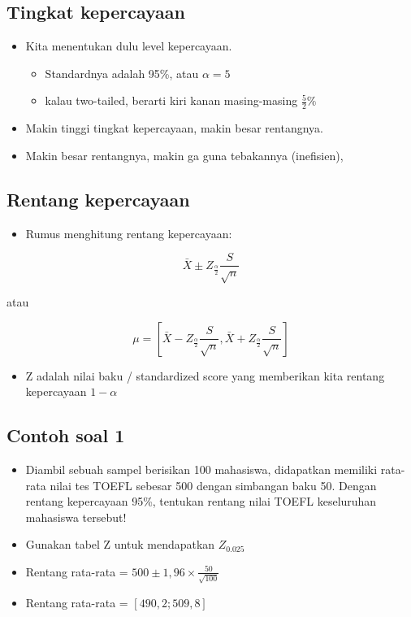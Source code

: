 \documentclass[
  letterpaper,
  DIV=11,
  numbers=noendperiod]{scrartcl}
\providecommand{\tightlist}{%
  \setlength{\itemsep}{0pt}\setlength{\parskip}{0pt}}\usepackage{longtable,booktabs,array}
\begin{document}
\hypertarget{tingkat-kepercayaan}{%
\subsection{Tingkat kepercayaan}\label{tingkat-kepercayaan}}

\begin{itemize}
\item
  Kita menentukan dulu level kepercayaan.

  \begin{itemize}
  \item
    Standardnya adalah 95\%, atau \(\alpha=5%
    \)
  \item
    kalau two-tailed, berarti kiri kanan masing-masing \(\frac{5}{2}\%\)
  \end{itemize}
\item
  Makin tinggi tingkat kepercayaan, makin besar rentangnya.
\item
  Makin besar rentangnya, makin ga guna tebakannya (inefisien),
\end{itemize}

\hypertarget{rentang-kepercayaan-1}{%
\subsection{Rentang kepercayaan}\label{rentang-kepercayaan-1}}

\begin{itemize}
\tightlist
\item
  Rumus menghitung rentang kepercayaan:
\end{itemize}

\[
\bar{X} \pm Z_{\frac{\alpha}{2}} \frac{S}{\sqrt{n}}
\]

atau

\[
\mu=\left[ \bar{X}-Z_{\frac{\alpha}{2}} \frac{S}{\sqrt{n}}, \bar{X}+Z_{\frac{\alpha}{2}}\frac{S}{\sqrt{n}}\right]
\]

\begin{itemize}
\tightlist
\item
  Z adalah nilai baku / standardized score yang memberikan kita rentang
  kepercayaan \(1-\alpha\)
\end{itemize}

\hypertarget{contoh-soal-1-1}{%
\subsection{Contoh soal 1}\label{contoh-soal-1-1}}

\begin{itemize}
\item
  Diambil sebuah sampel berisikan 100 mahasiswa, didapatkan memiliki
  rata-rata nilai tes TOEFL sebesar 500 dengan simbangan baku 50. Dengan
  rentang kepercayaan 95\%, tentukan rentang nilai TOEFL keseluruhan
  mahasiswa tersebut!
\item
  Gunakan tabel Z untuk mendapatkan \(Z_{0.025}\)
\item
  Rentang rata-rata = \(500 \pm 1,96\times\frac{50}{\sqrt{100}}\)
\item
  Rentang rata-rata = \(\left[490,2;509,8\right]\)
\end{itemize}
\end{document}
